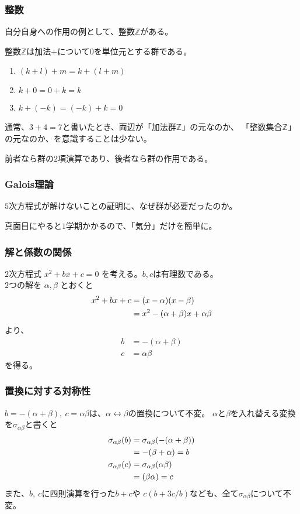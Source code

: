 \documentclass[12pt, t]{beamer}
\begin{document}
\begin{frame}
\frametitle{整数}
自分自身への作用の例として、整数$\mathbb{Z}$がある。

整数$\mathbb{Z}$は加法$+$について$0$を単位元とする群である。
\begin{enumerate}
\item $(k + l) + m = k + (l + m)$
\item $k + 0 = 0 + k = k$
\item $k + (-k) = (-k) + k = 0$
\end{enumerate}
通常、$3 + 4 = 7$と書いたとき、両辺が「加法群$\mathbb{Z}$」の元なのか、
「整数集合$\mathbb{Z}$」の元なのか、を意識することは少ない。

前者なら群の$2$項演算であり、後者なら群の作用である。
\end{frame}


\begin{frame}
\frametitle{Galois理論}
$5$次方程式が解けないことの証明に、なぜ群が必要だったのか。

真面目にやると$1$学期かかるので、「気分」だけを簡単に。
\end{frame}

\begin{frame}
\frametitle{解と係数の関係}
$2$次方程式 $x^2 + bx + c = 0$ を考える。$b, c$は有理数である。\\
$2$つの解を $\alpha, \beta$ とおくと
\begin{align}
  x^2 + bx + c &= (x - \alpha)(x - \beta) \notag \\
  &= x^2 -(\alpha + \beta)x + \alpha \beta
\end{align}
より、
\begin{align}
  b &= -(\alpha + \beta) \\
  c &= \alpha \beta
\end{align}
を得る。
\end{frame}

\begin{frame}
\frametitle{置換に対する対称性}
$b = -(\alpha + \beta),\ c = \alpha \beta$は、$\alpha \leftrightarrow \beta$の置換について不変。
$\alpha$と$\beta$を入れ替える変換を$\sigma_{\alpha \beta}$と書くと
\begin{align}
  \sigma_{\alpha \beta}(b) &= \sigma_{\alpha \beta} (-(\alpha + \beta)) \notag \\
                           &= -(\beta + \alpha) = b \\
  \sigma_{\alpha \beta}(c) &= \sigma_{\alpha \beta}(\alpha \beta) \notag \\
                           &= (\beta \alpha) = c
\end{align}
また、$b,\ c$に四則演算を行った$b + c$や $c (b + 3 c/b)$なども、全て$\sigma_{\alpha \beta}$について不変。
\end{frame}
\end{document}
